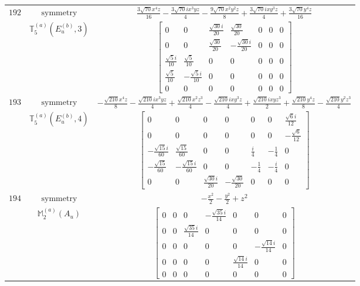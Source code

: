 \documentclass[fleqn,8pt,landscape]{jsarticle}
\begin{document}
\begin{longtable}{ccc}
$ 192 $ & $ \text{symmetry} $ & $ \frac{3 \sqrt{70} x^{4} z}{16} - \frac{3 \sqrt{70} i x^{3} y z}{4} - \frac{9 \sqrt{70} x^{2} y^{2} z}{8} + \frac{3 \sqrt{70} i x y^{3} z}{4} + \frac{3 \sqrt{70} y^{4} z}{16} $ \\
$  $ & $ \mathbb{T}_{5}^{(a)}(E_{u}^{(b)},3) $ & $ \begin{bmatrix} 0 & 0 & \frac{\sqrt{30} i}{20} & \frac{\sqrt{30}}{20} & 0 & 0 & 0 \\ 0 & 0 & \frac{\sqrt{30}}{20} & - \frac{\sqrt{30} i}{20} & 0 & 0 & 0 \\ \frac{\sqrt{5} i}{10} & \frac{\sqrt{5}}{10} & 0 & 0 & 0 & 0 & 0 \\ \frac{\sqrt{5}}{10} & - \frac{\sqrt{5} i}{10} & 0 & 0 & 0 & 0 & 0 \\ 0 & 0 & 0 & 0 & 0 & 0 & 0 \end{bmatrix} $ \\ \hline
$ 193 $ & $ \text{symmetry} $ & $ - \frac{\sqrt{210} x^{4} z}{8} - \frac{\sqrt{210} i x^{3} y z}{4} + \frac{\sqrt{210} x^{2} z^{3}}{4} - \frac{\sqrt{210} i x y^{3} z}{4} + \frac{\sqrt{210} i x y z^{3}}{2} + \frac{\sqrt{210} y^{4} z}{8} - \frac{\sqrt{210} y^{2} z^{3}}{4} $ \\
$  $ & $ \mathbb{T}_{5}^{(a)}(E_{u}^{(b)},4) $ & $ \begin{bmatrix} 0 & 0 & 0 & 0 & 0 & 0 & \frac{\sqrt{6} i}{12} \\ 0 & 0 & 0 & 0 & 0 & 0 & - \frac{\sqrt{6}}{12} \\ - \frac{\sqrt{15} i}{60} & \frac{\sqrt{15}}{60} & 0 & 0 & \frac{i}{4} & - \frac{1}{4} & 0 \\ - \frac{\sqrt{15}}{60} & - \frac{\sqrt{15} i}{60} & 0 & 0 & - \frac{1}{4} & - \frac{i}{4} & 0 \\ 0 & 0 & \frac{\sqrt{30} i}{20} & - \frac{\sqrt{30}}{20} & 0 & 0 & 0 \end{bmatrix} $ \\ \hline
$ 194 $ & $ \text{symmetry} $ & $ - \frac{x^{2}}{2} - \frac{y^{2}}{2} + z^{2} $ \\
$  $ & $ \mathbb{M}_{2}^{(a)}(A_{u}) $ & $ \begin{bmatrix} 0 & 0 & 0 & - \frac{\sqrt{35} i}{14} & 0 & 0 & 0 \\ 0 & 0 & \frac{\sqrt{35} i}{14} & 0 & 0 & 0 & 0 \\ 0 & 0 & 0 & 0 & 0 & - \frac{\sqrt{14} i}{14} & 0 \\ 0 & 0 & 0 & 0 & \frac{\sqrt{14} i}{14} & 0 & 0 \\ 0 & 0 & 0 & 0 & 0 & 0 & 0 \end{bmatrix} $ \\ \hline

\end{longtable}
\end{document}
